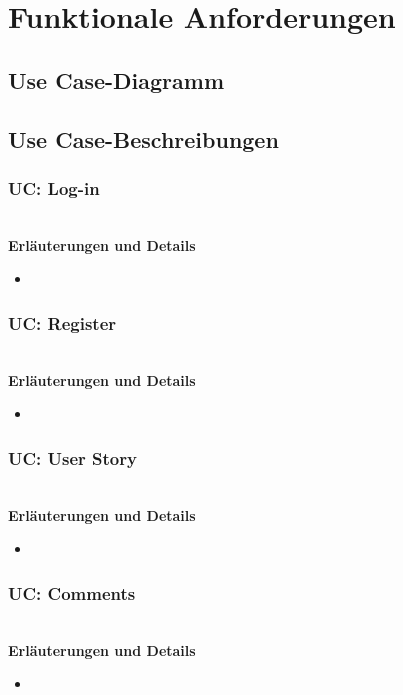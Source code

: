 \section{Funktionale Anforderungen}

\subsection{Use Case-Diagramm}

\pagebreak

\subsection{Use Case-Beschreibungen}

\subsubsection{UC: Log-in}

\\[0.5cm]
\textbf{Erläuterungen und Details}
\begin{itemize}
	\item 
\end{itemize}
\subsubsection{UC: Register}

\\[0.5cm]
\textbf{Erläuterungen und Details}
\begin{itemize}
	\item 
\end{itemize}
\subsubsection{UC: User Story}

\\[0.5cm]
\textbf{Erläuterungen und Details}
\begin{itemize}
	\item 
\end{itemize}
\subsubsection{UC: Comments}

\\[0.5cm]
\textbf{Erläuterungen und Details}
\begin{itemize}
	\item 
\end{itemize}